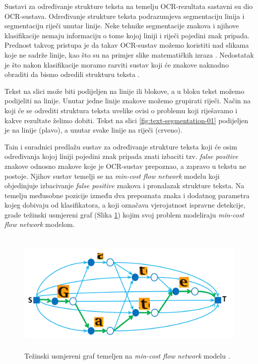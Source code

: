 \documentclass[times, utf8, zavrsni]{fer}
\begin{document}
Sustavi za određivanje strukture teksta na temelju OCR-rezultata sastavni su dio OCR-sustava. Određivanje strukture teksta
podrazumjeva segmentaciju linija i segmentaciju riječi unutar linije. Neke tehnike segmentacije
znakova i njihove klasifikacije nemaju informaciju o tome kojoj liniji i riječi pojedini znak pripada.
Prednost takvog pristupa je da takav OCR-sustav možemo koristiti nad slikama koje ne sadrže linije,
kao što su na primjer slike matematičkih izraza \citep{Jurin:2017:Master}. Nedostatak je što nakon klasifikacije
moramo razviti sustav koji će znakove naknadno obraditi da bismo odredili strukturu teksta \citep{Jurin:2017:Master}.

Tekst na slici može biti podijeljen na linije ili blokove, a u bloku
tekst možemo podijeliti na linije. Unutar jedne linije znakove možemo grupirati riječi. Način na
koji će se odrediti struktura teksta uvelike ovisi o problemu koji riješavamo i kakve rezultate
želimo dobiti. Tekst na slici \ref{fig:text-segmentation-01} podijeljen je na linije (plavo), a unutar
svake linije na riječi (crveno).

Tain i suradnici \citep{DBLP:journals/corr/TianPHLYT16} predlažu sustav za određivanje strukture teksta
koji će osim određivanja kojoj liniji pojedini znak pripada znati izbaciti tzv. \emph{false positive}
znakove odnosno znakove koje je OCR-sustav prepoznao, a zapravo u tekstu ne postoje. Njihov sustav temelji
se na \emph{min-cost flow network} modelu koji objedinjuje izbacivanje \emph{false positive} znakova i
pronalazak strukture teksta. Na temelju međusobne pozicije između dva prepoznata znaka i
dodatnog parametra kojeg dobivaju od klasifikatora, a koji označava vjerojatnost ispravne detekcije, grade težinski
usmjereni graf (Slika \ref{fig:text-flow}) kojim svoj problem modeliraju \emph{min-cost flow network} modelom.

\begin{figure}[htb]
    \centering
    \captionsetup{justification=centering,margin=2cm}
    \includegraphics[height=6cm]{images/text-flow.png}
    \caption{Težinski usmjereni graf temeljen na \emph{min-cost flow network} modelu \citep{DBLP:journals/corr/TianPHLYT16}.}
    \label{fig:text-flow}
\end{figure}
\end{document}
